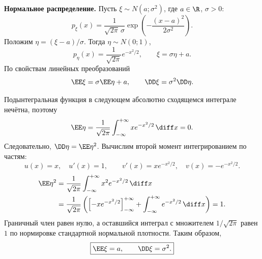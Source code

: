 \begin{solution}
    \textbf{Нормальное распределение.}
    Пусть $\xi\sim N(a;\sigma^2)$, где $a\in\R$, $\sigma>0$:
    \[
        p_\xi(x)=\frac1{\sqrt{2\pi}\,\sigma}
        \exp\left(-\frac{(x-a)^2}{2\sigma^2}\right).
    \]
    Положим $\eta=(\xi-a)/\sigma$. Тогда $\eta\sim N(0;1)$,
    \[
        p_\eta(x)=\frac1{\sqrt{2\pi}}e^{-x^2/2},
        \qquad \xi=\sigma\eta+a.
    \]
    По свойствам линейных преобразований
    \[
        \EE\xi=\sigma\EE\eta+a,
        \qquad \DD\xi=\sigma^2\DD\eta.
    \]

    Подынтегральная функция в следующем абсолютно сходящемся интеграле
    нечётна, поэтому
    \[
        \EE\eta=\frac1{\sqrt{2\pi}}
        \int_{-\infty}^{+\infty}xe^{-x^2/2}\,\diff x=0.
    \]
    Следовательно, $\DD\eta=\EE\eta^2$.
    Вычислим второй момент интегрированием по частям:
    \[
        u(x)=x,\quad u'(x)=1,
        \qquad v'(x)=xe^{-x^2/2},\quad v(x)=-e^{-x^2/2}.
    \]
    \[
        \begin{aligned}
            \EE\eta^2
            &=\frac1{\sqrt{2\pi}}
              \int_{-\infty}^{+\infty}x^2e^{-x^2/2}\,\diff x\\
            &=\frac1{\sqrt{2\pi}}
              \left(\left[-xe^{-x^2/2}\right]_{-\infty}^{+\infty}
              +\int_{-\infty}^{+\infty}e^{-x^2/2}\,\diff x\right)
              =1.
        \end{aligned}
    \]
    Граничный член равен нулю, а оставшийся интеграл с множителем
    $1/\sqrt{2\pi}$ равен $1$ по нормировке стандартной нормальной плотности.
    Таким образом,
    \[
        \boxed{\EE\xi=a,\qquad \DD\xi=\sigma^2.}
    \]
\end{solution}
\endgroup
